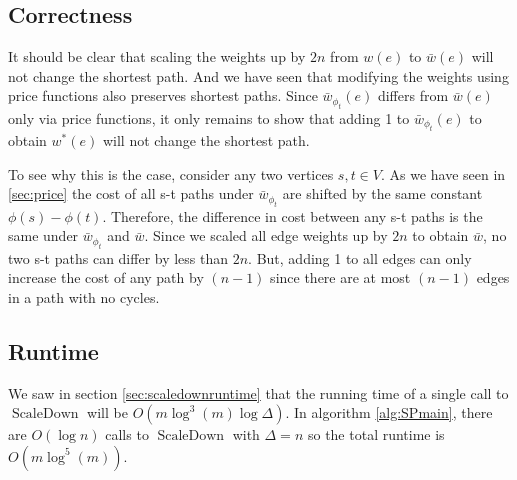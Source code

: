 \documentclass[11pt]{article}
\newcommand{\ScaleDown}{\operatorname{ScaleDown}}
\newcommand{\wstar}{w^*}
\newcommand{\wbar}{\bar{w}}
\begin{document}
\subsection{Correctness}
It should be clear that scaling the weights up by $2n$ from $w(e)$ to $\bar w(e)$ will not change the shortest path. And we have seen that modifying the weights using price functions also preserves shortest paths. Since $\wbar_{\phi_t}(e) $ differs from $\bar w(e)$ only via price functions, it only remains to show that adding 1 to $\wbar_{\phi_t}(e) $ to obtain $\wstar(e) $ will not change the shortest path.

To see why this is the case, consider any two vertices $s, t \in V$. As we have seen in \ref{sec:price} the cost of all s-t paths under
$\wbar_{\phi_t}$ are shifted by the same constant $\phi(s) - \phi(t)$. Therefore, the difference in cost between any s-t paths is the same under 
$\wbar_{\phi_t}$ and $\bar w$. Since we scaled all edge weights up by $2n$ to obtain $\bar w$, no two s-t paths can differ by less than $2n$. But, adding 1 to all edges can only increase the cost of any path by $(n-1)$ since there are at most $(n-1)$ edges in a path with no cycles. 

 \subsection{Runtime}
We saw in section \ref{sec:scaledownruntime} that the running time of a single call to $\ScaleDown$ will be $O\left(m \log^3 (m) \log \Delta \right)$. In algorithm \ref{alg:SPmain}, there are $O(\log n)$ calls to $\ScaleDown$ with $\Delta = n$ so the total runtime is $O\left(m \log^5 (m) \right)$. 

\printbibliography
\end{document}
